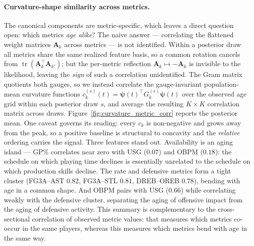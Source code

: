 \paragraph{Curvature-shape similarity across metrics.}
The canonical components are metric-specific, which leaves a direct question open: which metrics \emph{age alike}?  The naive answer --- correlating the flattened weight matrices $\mathbf{A}_k$ across metrics --- is not identified.  Within a posterior draw all metrics share the same realized feature basis, so a common rotation cancels from $\operatorname{tr}(\mathbf{A}_k^\top \mathbf{A}_{k'})$; but the per-metric reflection $\mathbf{A}_k \mapsto -\mathbf{A}_k$ is invisible to the likelihood, leaving the \emph{sign} of such a correlation unidentified.  The Gram matrix quotients both gauges, so we instead correlate the gauge-invariant population-mean curvature functions $c^{(s)}_k(t) = \boldsymbol\psi(t)^\top G^{(s)}_k \boldsymbol\psi(t)$ over the observed age grid within each posterior draw $s$, and average the resulting $K \times K$ correlation matrix across draws.  Figure~\ref{fig:curvature_metric_corr} reports the posterior mean.  One caveat governs its reading: every $c_k$ is non-negative and grows away from the peak, so a positive baseline is structural to concavity and the \emph{relative} ordering carries the signal.  Three features stand out.  Availability is an aging island --- GP\% correlates near zero with USG ($0.07$) and OBPM ($0.18$): the schedule on which playing time declines is essentially unrelated to the schedule on which production skills decline.  The rate and defensive metrics form a tight cluster (FG3A--AST $0.82$, FG3A--STL $0.81$, DREB--OREB $0.78$), bending with age in a common shape.  And OBPM pairs with USG ($0.66$) while correlating weakly with the defensive cluster, separating the aging of offensive impact from the aging of defensive activity.  This summary is complementary to the cross-sectional correlation of observed metric values: that measures which metrics co-occur in the same players, whereas this measures which metrics bend with age in the same way.

